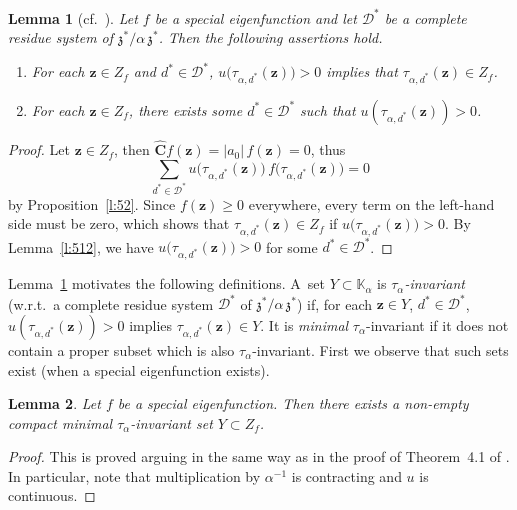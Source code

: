 \documentclass[12pt]{amsart}
\newtheorem{lemma}{Lemma}[section]
\theoremstyle{definition}
\theoremstyle{remark}
\numberwithin{equation}{section}
\begin{document}
\begin{lemma}[{cf.\ \cite[Lemma~3.2]{Lagarias-Wang:97}}] \label{l:32}
Let $f$ be a special eigenfunction and let $\mathcal{D}^*$ be a complete residue system of $\mathfrak{z}^* / \alpha\, \mathfrak{z}^*$.
Then the following assertions hold.

\begin{enumerate}
\itemsep1ex
\item \label{1}
For each $\mathbf{z} \in Z_f$ and $d^* \in \mathcal{D}^*$, $u\big(\tau_{\alpha,d^*}(\mathbf{z})\big) > 0$ implies that $\tau_{\alpha,d^*}(\mathbf{z}) \in Z_f$.
\item \label{2}
For each $\mathbf{z} \in Z_f$, there exists some $d^* \in \mathcal{D}^*$ such that $u(\tau_{\alpha,d^*}(\mathbf{z})) > 0$.
\end{enumerate}
\end{lemma}

\begin{proof}
Let $\mathbf{z} \in Z_f$, then $\widehat{\mathbf{C}} f(\mathbf{z}) = |a_0|\, f(\mathbf{z}) = 0$, thus
\[
\sum_{d^*\in\mathcal{D}^*} u\big(\tau_{\alpha,d^*}(\mathbf{z})\big)\, f\big(\tau_{\alpha,d^*}(\mathbf{z})\big) = 0
\]
by Proposition~\ref{l:52}.
Since $f(\mathbf{z}) \ge 0$ everywhere, every term on the left-hand side must be zero, which shows that $\tau_{\alpha,d^*}(\mathbf{z}) \in Z_f$ if $u\big(\tau_{\alpha,d^*}(\mathbf{z})\big) > 0$.
By Lemma~\ref{l:512}, we have $u\big(\tau_{\alpha,d^*}(\mathbf{z})\big) > 0$ for some $d^* \in \mathcal{D}^*$.
\end{proof}

Lemma~\ref{l:32} motivates the following definitions.
A~set $Y \subset \mathbb{K}_\alpha$ is \emph{$\tau_\alpha$-invariant} (w.r.t.\ a complete residue system $\mathcal{D}^*$ of $\mathfrak{z}^* / \alpha\, \mathfrak{z}^*$) if, for each $\mathbf{z} \in Y$, $d^* \in \mathcal{D}^*$, $u(\tau_{\alpha,d^*}(\mathbf{z})) > 0$ implies $\tau_{\alpha,d^*}(\mathbf{z}) \in Y$.
It is \emph{minimal} $\tau_\alpha$-invariant if it does not contain a proper subset which is also $\tau_\alpha$-invariant.
First we observe that such sets exist (when a special eigenfunction exists).

\begin{lemma} \label{l:NCMI}
Let $f$ be a special eigenfunction.
Then there exists a non-empty compact minimal $\tau_\alpha$-invariant set $Y \subset Z_f$.
\end{lemma}

\begin{proof}
This is proved arguing in the same way as in the proof of Theorem~4.1 of \cite{Lagarias-Wang:97}.
In particular, note that multiplication by $\alpha^{-1}$ is contracting and $u$ is continuous.
\end{proof}
\end{document}
